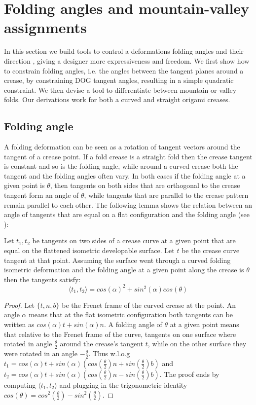 \section{Folding angles and mountain-valley assignments} \label{sec:folding_angles_mountain_valley}
In this section we build tools to control a deformations folding angles and their direction , giving a designer more expressiveness and freedom. We first show how to constrain folding angles, i.e. the angles between the tangent planes around a crease, by constraining DOG tangent angles, resulting in a simple quadratic constraint. We then devise a tool to differentiate between mountain or valley folds. Our derivations work for both a curved and straight origami creases.

\subsection{Folding angle} A folding deformation can be seen as a rotation of tangent vectors around the tangent of a crease point. If a fold crease is a straight fold then the crease tangent is constant and so is the folding angle, while around a curved crease both the tangent and the folding angles often vary. In both cases if the folding angle at a given point is $\theta$, then tangents on both sides that are orthogonal to the crease tangent form an angle of $\theta$, while tangents that are parallel to the crease pattern remain parallel to each other. The following lemma shows the relation between an angle of tangents that are equal on a flat configuration and the folding angle (see ): 
 \begin{lemma}  \label{lem:tangents_dihedral}
 Let $t_1,t_2$ be tangents on two sides of a crease curve at a given point that are equal on the flattened isometric developable surface. Let $t$ be the crease curve tangent at that point. Assuming the surface went through a curved folding isometric deformation and the folding angle at a given point along the crease is $\theta$ then the tangents satisfy:
\begin{equation} \label{eq:tangents_dihedral}
\langle t_1, t_2 \rangle = cos(\alpha)^2 + sin^2(\alpha) cos(\theta) \end{equation}
\end{lemma}
\begin{proof}{Let $\{t,n,b\}$ be the Frenet frame of the curved crease at the point. An angle $\alpha$ means that at the flat isometric configuration both tangents can be written as $cos(\alpha)t + sin(\alpha)n$. A folding angle of $\theta$ at a given point means that relative to the Frenet frame of the curve, tangents on one surface where rotated in angle $\frac{\theta}{2}$ around the crease's tangent $t$, while on the other surface they were rotated in an angle  $-\frac{\theta}{2}$. Thus w.l.o.g $t_1 = cos(\alpha)t + sin(\alpha)(cos(\frac{\theta}{2})n+sin(\frac{\theta}{2})b)$ and $t_2 = cos(\alpha)t + sin(\alpha)(cos(\frac{\theta}{2})n-sin(\frac{\theta}{2})b)$. The proof ends by computing $\langle t_1,t_2 \rangle$ and plugging in the trigonometric identity $cos(\theta) = cos^2(\frac{\theta}{2})-sin^2(\frac{\theta}{2})$.}\end{proof}

